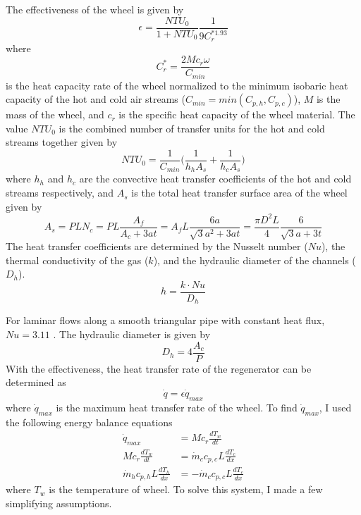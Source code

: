\documentclass[12pt]{report}
\begin{document}
The effectiveness of the wheel is given by 
\begin{equation}
\epsilon = \frac{NTU_0}{1+NTU_0}\frac{1}{9C_r^{*1.93}}
\end{equation}
 where
 \begin{equation}
C_r^* = \frac{2Mc_r\omega}{C_{min}}
\end{equation}
is the heat capacity rate of the wheel normalized to the minimum isobaric heat capacity of the hot and cold air streams ($C_{min}=min(C_{p,h},C_{p,c})$), $M$ is the mass of the wheel, and $c_r$ is the specific heat capacity of the wheel material.  The value $NTU_0$ is the combined number of transfer units for the hot and cold streams together given by 
 \begin{equation}
NTU_0 = \frac{1}{C_{min}}\biggr(\frac{1}{h_h A_s} + \frac{1}{h_c A_s}\biggl)
\end{equation}
where $h_h$ and $h_c$ are the convective heat transfer coefficients of the hot and cold streams respectively, and $A_s$ is the total heat transfer surface area of the wheel given by
 \begin{equation}
A_s = PLN_c = PL\frac{A_f}{A_c+3at}=A_fL\frac{6a}{\sqrt{3}a^2 + 3at}=\frac{\pi D^2L}{4}\frac{6}{\sqrt{3}a+3t}
\end{equation}
The heat transfer coefficients are determined by the Nusselt number ($Nu$), the thermal conductivity of the gas ($k$), and the hydraulic diameter of the channels ($D_h$).  
\begin{equation}
h = \frac{k\cdot Nu}{D_h}
\end{equation}

For laminar flows along a smooth triangular pipe with constant heat flux, $Nu = 3.11$ \cite{dewit07}.  The hydraulic diameter is given by 
\begin{equation}
D_h = 4\frac{A_c}{P} 
\end{equation}
With the effectiveness, the heat transfer rate of the regenerator can be determined as 
\begin{equation}
\dot{q} = \epsilon\dot{q}_{max}
\end{equation}
where $\dot{q}_{max}$ is the maximum heat transfer rate of the wheel.  To find $\dot{q}_{max}$, I used the following energy balance equations 
\begin{align}
\dot{q}_{max} &= Mc_r \frac{dT_w}{dt}\\
Mc_r \frac{dT_w}{dt}& = \dot{m}_cc_{p,c}L\frac{dT_c}{dx}\\
\dot{m}_hc_{p,h}L\frac{dT_h}{dx} &= -\dot{m}_cc_{p,c}L\frac{dT_c}{dx}
\end{align}
where $T_{w}$ is the temperature of wheel.  To solve this system, I made a few simplifying assumptions. 
\end{document}
